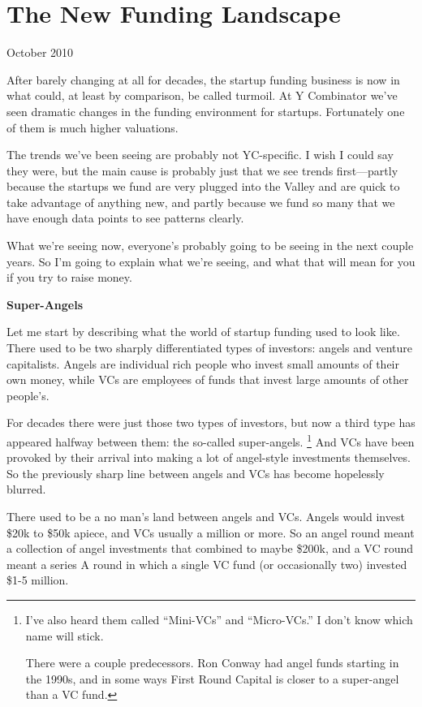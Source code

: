 \chapter{The New Funding Landscape}

October 2010

After barely changing at all for decades, the startup funding business
is now in what could, at least by comparison, be called turmoil. At Y
Combinator we've seen dramatic changes in the funding environment for
startups. Fortunately one of them is much higher valuations.

The trends we've been seeing are probably not YC-specific. I wish I
could say they were, but the main cause is probably just that we see
trends first---partly because the startups we fund are very plugged into
the Valley and are quick to take advantage of anything new, and partly
because we fund so many that we have enough data points to see patterns
clearly.

What we're seeing now, everyone's probably going to be seeing in the
next couple years. So I'm going to explain what we're seeing, and what
that will mean for you if you try to raise money.

\textbf{Super-Angels}

Let me start by describing what the world of startup funding used to
look like. There used to be two sharply differentiated types of
investors: angels and venture capitalists. Angels are individual rich
people who invest small amounts of their own money, while VCs are
employees of funds that invest large amounts of other people's.

For decades there were just those two types of investors, but now a
third type has appeared halfway between them: the so-called
super-angels. \footnote{I've also heard them called ``Mini-VCs'' and ``Micro-VCs.'' I
don't know which name will stick.

There were a couple predecessors. Ron Conway had angel funds starting in
the 1990s, and in some ways First Round Capital is closer to a
super-angel than a VC fund.} And VCs have been provoked by
their arrival into making a lot of angel-style investments themselves.
So the previously sharp line between angels and VCs has become
hopelessly blurred.

There used to be a no man's land between angels and VCs. Angels would
invest \$20k to \$50k apiece, and VCs usually a million or more. So an
angel round meant a collection of angel investments that combined to
maybe \$200k, and a VC round meant a series A round in which a single VC
fund (or occasionally two) invested \$1-5 million.

